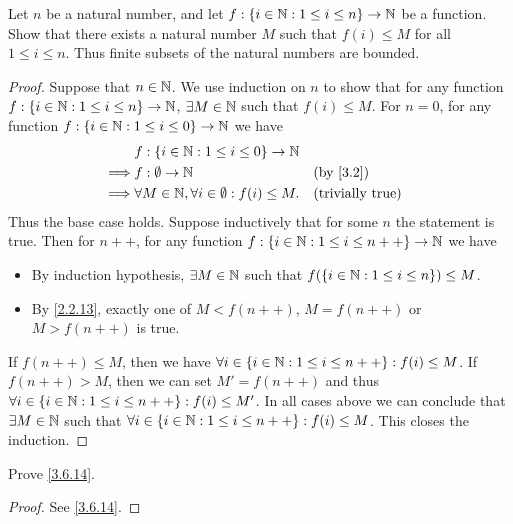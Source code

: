 \begin{ex}\label{ex:3.6.3}
  Let \(n\) be a natural number, and let \(f : \{i \in \mathbb{N} : 1 \leq i \leq n\} \to \mathbb{N}\) be a function.
  Show that there exists a natural number \(M\) such that \(f(i) \leq M\) for all \(1 \leq i \leq n\).
  Thus finite subsets of the natural numbers are bounded.
\end{ex}

\begin{proof}
  Suppose that \(n \in \mathbb{N}\).
  We use induction on \(n\) to show that for any function \(f : \{i \in \mathbb{N} : 1 \leq i \leq n\} \to \mathbb{N}\), \(\exists M \in \mathbb{N}\) such that \(f(i) \leq M\).
  For \(n = 0\), for any function \(f : \{i \in \mathbb{N} : 1 \leq i \leq 0\} \to \mathbb{N}\) we have
  \begin{align*}
             & f : \{i \in \N : 1 \leq i \leq 0\} \to \N                                             \\
    \implies & f : \emptyset \to \N                                     &  & \text{(by \cref{3.2})}  \\
    \implies & \forall M \in \N, \forall i \in \emptyset : f(i) \leq M. &  & \text{(trivially true)} \\
  \end{align*}
  Thus the base case holds.
  Suppose inductively that for some \(n\) the statement is true.
  Then for \(n++\), for any function \(f : \{i \in \mathbb{N} : 1 \leq i \leq n++\} \to \mathbb{N}\) we have
  \begin{itemize}
    \item By induction hypothesis, \(\exists M \in \mathbb{N}\) such that \(f(\{i \in \mathbb{N} : 1 \leq i \leq n\}) \leq M\).
    \item By \cref{2.2.13}, exactly one of \(M < f(n++)\), \(M = f(n++)\) or \(M > f(n++)\) is true.
  \end{itemize}
  If \(f(n++) \leq M\), then we have \(\forall i \in \{i \in \mathbb{N} : 1 \leq i \leq n++\} : f(i) \leq M\).
  If \(f(n++) > M\), then we can set \(M' = f(n++)\) and thus \(\forall i \in \{i \in \mathbb{N} : 1 \leq i \leq n++\} : f(i) \leq M'\).
  In all cases above we can conclude that \(\exists M \in \mathbb{N}\) such that \(\forall i \in \{i \in \mathbb{N} : 1 \leq i \leq n++\} : f(i) \leq M\).
  This closes the induction.
\end{proof}

\begin{ex}\label{ex:3.6.4}
  Prove \cref{3.6.14}.
\end{ex}

\begin{proof}
  See \cref{3.6.14}.
\end{proof}

